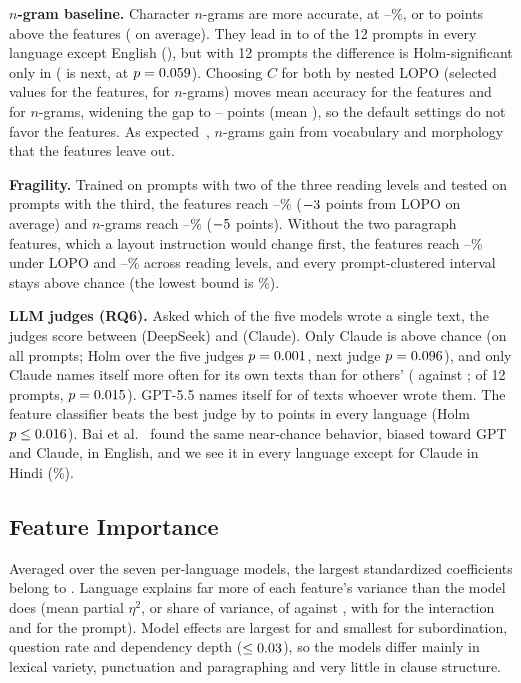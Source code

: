 \documentclass[conference,compsoc]{IEEEtran}
\begin{document}
\textbf{$n$-gram baseline.} Character $n$-grams are more accurate, at \NGmin{}--\NGmax{}\%, or \GapNGmin{} to \GapNGmax{} points above the features (\GapNGmean{} on average). They lead in \PLNGFavMin{} to \PLNGFavMax{} of the 12 prompts in every language except English (\PLNGFavEn{}), but with 12 prompts the difference is Holm-significant only in \PLNGsigLangs{} (\PLNGNextLang{} is next, at $p = 0.059{}$). Choosing $C$ for both by nested LOPO (selected values \TunedFeatC{} for the features, \TunedNGC{} for $n$-grams) moves mean accuracy \TunedFeatMeanChange{} for the features and \TunedNGMeanChange{} for $n$-grams, widening the gap to \TunedGapMin{}--\TunedGapMax{} points (mean \TunedGapMean{}), so the default settings do not favor the features. As expected~\cite{sapkota2015ngrams}, $n$-grams gain from vocabulary and morphology that the features leave out.

\textbf{Fragility.} Trained on prompts with two of the three reading levels and tested on prompts with the third, the features reach \LOTOFeatMin{}--\LOTOFeatMax{}\% ($-3{}$ points from LOPO on average) and $n$-grams reach \LOTONGMin{}--\LOTONGMax{}\% ($-5{}$ points). Without the two paragraph features, which a layout instruction would change first, the features reach \NoParaMin{}--\NoParaMax{}\% under LOPO and \LOTONoParaMin{}--\LOTONoParaMax{}\% across reading levels, and every prompt-clustered interval stays above chance (the lowest bound is \LOTONoParaCIminLo{}\%).

\textbf{LLM judges (RQ6).} Asked which of the five models wrote a single text, the judges score between \Judgedeepseek{} (DeepSeek) and \Judgeclaude{} (Claude). Only Claude is above chance (on all \PLClaudePrompts{} prompts; Holm over the five judges $p = 0.001{}$, next judge $p = 0.096{}$), and only Claude names itself more often for its own texts than for others' (\JudgeclaudeOwn{} against \JudgeclaudeFalse{}; \PLClaudeSelfPrompts{} of 12 prompts, $p = 0.015{}$). GPT-5.5 names itself for \JudgegptSelfClaim{} of texts whoever wrote them. The feature classifier beats the best judge by \GapJudgeMin{} to \GapJudgeMax{} points in every language (Holm $p \leq 0.016{}$). Bai et al.~\cite{bai2025selfrecognition} found the same near-chance behavior, biased toward GPT and Claude, in English, and we see it in every language except for Claude in Hindi (\JudgeBesthi{}\%).

\subsection{Feature Importance}
\label{sec:economy}
Averaged over the seven per-language models, the largest standardized coefficients belong to \TopCoefFeatures{}. Language explains far more of each feature's variance than the model does (mean partial $\eta^2$, or share of variance, of \EtaLang{} against \EtaModel{}, with \EtaInter{} for the interaction and \EtaPrompt{} for the prompt). Model effects are largest for \EtaModelTopFive{} and smallest for subordination, question rate and dependency depth ($\leq 0.03{}$), so the models differ mainly in lexical variety, punctuation and paragraphing and very little in clause structure.
\end{document}
